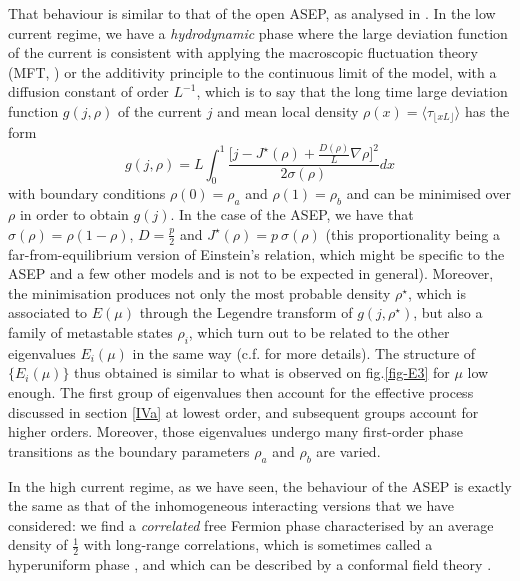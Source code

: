 \documentclass[aps,pre,onecolumn,showpacs,showkeys,a4paper]{revtex4-1}
\begin{document}
That behaviour is similar to that of the open ASEP, as analysed in \cite{Bodineau2006,Lazarescu2015}. In the low current regime, we have a \textit{hydrodynamic} phase where the large deviation function of the current is consistent with applying the macroscopic fluctuation theory (MFT, \cite{Bertini2007}) or the additivity principle \cite{PhysRevLett.92.180601} to the continuous limit of the model, with a diffusion constant of order $L^{-1}$, which is to say that the long time large deviation function $g(j,\rho)$ of the current $j$ and mean local density $\rho(x)=\langle\tau_{\lfloor xL\rfloor}\rangle$ has the form
\begin{equation}\label{gjr}
g(j,\rho)=L\int_0^1\frac{\bigl[j-J^\star(\rho)+\frac{D(\rho)}{L}\nabla\rho\bigr]^2}{2\sigma(\rho)}dx
\end{equation}
with boundary conditions $\rho(0)=\rho_a$ and $\rho(1)=\rho_b$ and can be minimised over $\rho$ in order to obtain $g(j)$. In the case of the ASEP, we have that $\sigma(\rho)=\rho(1-\rho)$, $D=\frac{p}{2}$ and $J^\star(\rho)=p~\sigma(\rho)$ (this proportionality being a far-from-equilibrium version of Einstein's relation, which might be specific to the ASEP and a few other models and is not to be expected in general). Moreover, the minimisation produces not only the most probable density $\rho^\star$, which is associated to $E(\mu)$ through the Legendre transform of $g(j,\rho^\star)$, but also a family of metastable states $\rho_i$, which turn out to be related to the other eigenvalues $E_i(\mu)$ in the same way (c.f. \cite{Lazarescu} for more details). The structure of $\{E_i(\mu)\}$ thus obtained is similar to what is observed on fig.\ref{fig-E3} for $\mu$ low enough. The first group of eigenvalues then account for the effective process discussed in section \ref{IVa} at lowest order, and subsequent groups account for higher orders. Moreover, those eigenvalues undergo many first-order phase transitions as the boundary parameters $\rho_a$ and $\rho_b$ are varied.

In the high current regime, as we have seen, the behaviour of the ASEP is exactly the same as that of the inhomogeneous interacting versions that we have considered: we find a \textit{correlated} free Fermion phase characterised by an average density of $\frac{1}{2}$ with long-range correlations, which is sometimes called a hyperuniform phase \cite{Jack2015}, and which can be described by a conformal field theory \cite{Karevski2016}.
\end{document}
